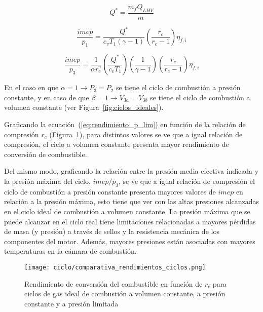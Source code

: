 \begin{equation}
    \label{eq:Q*} Q^{*}=  \frac{m_{f}Q_{LHV}}{m}
\end{equation}



\begin{equation}
    \label{eq:imep_p1} \frac{imep}{p_1} = \frac{Q^*}{c_v T_1 (\gamma-1)} \left( \frac{r_c}{r_c-1} \right) \eta_{f,i}
\end{equation}

\begin{equation}
    \label{eq:imep_p3} \frac{imep}{p_3} = \frac{1}{\alpha r_c^\gamma} \left( \frac{Q^*}{c_v T_1} \right) \left(\frac{1}{\gamma-1} \right) \left( \frac{r_c}{r_c-1} \right) \eta_{f,i}
\end{equation}

En el caso en que  $\alpha=1 \rightarrow P_3=P_2$ se tiene el ciclo de
combustión a presión constante, y en caso de que
$\beta=1 \rightarrow V_{3a}=V_{3b}$ se tiene el ciclo de combustión a volumen
constante (ver Figura~\ref{fig:ciclos_ideales}).

Graficando la ecuación~(\ref{eq:rendimiento_p_lim}) en función de la relación de
compresión $r_c$ (Figura~\ref{fig:rendimientos}), para distintos valores se ve
que a igual relación de compresión, el ciclo a volumen constante presenta mayor
rendimiento de conversión de combustible.

Del mismo modo, graficando la relación entre la presión media efectiva indicada
y la presión máxima del ciclo, $imep/p_3$, se ve que a igual relación de
compresión el ciclo de combustión a presión constante presenta mayores valores
de $imep$ en relación a la presión máxima, esto tiene que ver con las altas
presiones alcanzadas en el ciclo ideal de combustión a volumen constante.
%
La presión máxima que se puede alcanzar en el ciclo real tiene limitaciones
relacionadas a mayores pérdidas de masa (y presión) a través de sellos y la
resistencia mecánica de los componentes del motor.
%
Además, mayores presiones están asociadas con mayores temperaturas en la cámara
de combustión.

\begin{figure} \centering
\texttt{[image: ciclo/comparativa\_rendimientos\_ciclos.png]}
    \caption{Rendimiento de conversión del combustible en función de $r_c$ para
ciclos de gas ideal de combustión a volumen constante, a presión constante y a
presión limitada~\parencite{heywood}} \label{fig:rendimientos}
\end{figure}


